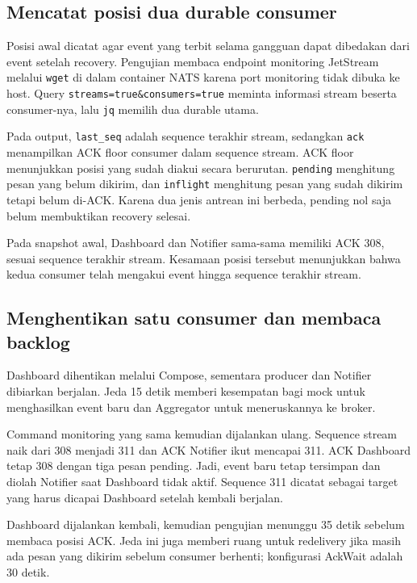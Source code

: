 \subsection{Mencatat posisi dua durable consumer}
Posisi awal dicatat agar event yang terbit selama gangguan dapat dibedakan dari event setelah recovery. Pengujian membaca endpoint monitoring JetStream melalui \texttt{wget} di dalam container NATS karena port monitoring tidak dibuka ke host. Query \texttt{streams=true\&consumers=true} meminta informasi stream beserta consumer-nya, lalu \texttt{jq} memilih dua durable utama.

Pada output, \texttt{last\_seq} adalah sequence terakhir stream, sedangkan \texttt{ack} menampilkan ACK floor consumer dalam sequence stream. ACK floor menunjukkan posisi yang sudah diakui secara berurutan. \texttt{pending} menghitung pesan yang belum dikirim, dan \texttt{inflight} menghitung pesan yang sudah dikirim tetapi belum di-ACK. Karena dua jenis antrean ini berbeda, pending nol saja belum membuktikan recovery selesai.

Pada snapshot awal, Dashboard dan Notifier sama-sama memiliki ACK 308, sesuai sequence terakhir stream. Kesamaan posisi tersebut menunjukkan bahwa kedua consumer telah mengakui event hingga sequence terakhir stream.

\subsection{Menghentikan satu consumer dan membaca backlog}
Dashboard dihentikan melalui Compose, sementara producer dan Notifier dibiarkan berjalan. Jeda 15 detik memberi kesempatan bagi mock untuk menghasilkan event baru dan Aggregator untuk meneruskannya ke broker.

Command monitoring yang sama kemudian dijalankan ulang. Sequence stream naik dari 308 menjadi 311 dan ACK Notifier ikut mencapai 311. ACK Dashboard tetap 308 dengan tiga pesan pending. Jadi, event baru tetap tersimpan dan diolah Notifier saat Dashboard tidak aktif. Sequence 311 dicatat sebagai target yang harus dicapai Dashboard setelah kembali berjalan.

Dashboard dijalankan kembali, kemudian pengujian menunggu 35 detik sebelum membaca posisi ACK. Jeda ini juga memberi ruang untuk redelivery jika masih ada pesan yang dikirim sebelum consumer berhenti; konfigurasi AckWait adalah 30 detik.

